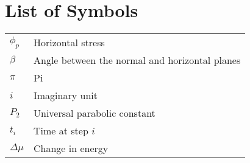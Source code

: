 \chapter*{List of Symbols} \label{symbols}

\begin{tabular}{@{}C{1in} L{4.5in}}
$\phi_p$ & Horizontal stress \\
$\beta$ & Angle between the normal and horizontal planes \\
$\pi$ & Pi \\
$i$ & Imaginary unit \\
$P_2$ & Universal parabolic constant \\
$t_i$ & Time at step $i$ \\
$\Delta\mu$ & Change in energy \\
\end{tabular}

